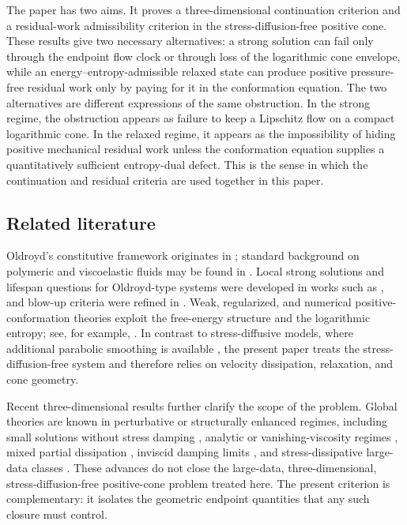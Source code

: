 \documentclass[11pt]{article}
\numberwithin{equation}{section}
\begin{document}
The paper has two aims.  It proves a three-dimensional continuation criterion
and a residual-work admissibility criterion in the stress-diffusion-free
positive cone.  These results give two necessary alternatives: a strong solution
can fail only through the endpoint flow clock or through loss of the
logarithmic cone envelope, while an energy--entropy-admissible relaxed state can
produce positive pressure-free residual work only by paying for it in the
conformation equation.  The two alternatives are different expressions of the
same obstruction.  In the strong regime, the obstruction appears as failure to
keep a Lipschitz flow on a compact logarithmic cone.  In the relaxed regime, it
appears as the impossibility of hiding positive mechanical residual work unless
the conformation equation supplies a quantitatively sufficient entropy-dual
defect.  This is the sense in which the continuation and residual criteria are
used together in this paper.

\subsection*{Related literature}

Oldroyd's constitutive framework originates in \cite{Oldroyd}; standard
background on polymeric and viscoelastic fluids may be found in
\cite{Bird,Renardy,RenardyThomases}.  Local strong solutions and lifespan
questions for Oldroyd-type systems were developed in works such as
\cite{GuillopeSaut,CheminMasmoudi}, and blow-up criteria were refined in
\cite{LeiMasmoudiZhou}.  Weak, regularized, and numerical
positive-conformation theories exploit the free-energy structure and the
logarithmic entropy; see, for example, \cite{LionsMasmoudi,BarrettBoyaval}.
In contrast to stress-diffusive models, where additional parabolic smoothing is
available \cite{ConstantinKliegl,ElgindiRousset,HuangLiuZi}, the present paper
treats the stress-diffusion-free system and therefore relies on velocity
dissipation, relaxation, and cone geometry.

Recent three-dimensional results further clarify the scope of the problem.
Global theories are known in perturbative or structurally enhanced regimes,
including small solutions without stress damping \cite{Zhu2018}, analytic or
vanishing-viscosity regimes \cite{Zi2021}, mixed partial dissipation
\cite{LinWuBoardman}, inviscid damping limits \cite{ChengLuoYangYuan}, and
stress-dissipative large-data classes \cite{LiangLiZhai}.  These advances do
not close the large-data, three-dimensional, stress-diffusion-free positive-cone
problem treated here.  The present criterion is complementary: it isolates the
geometric endpoint quantities that any such closure must control.
\end{document}
